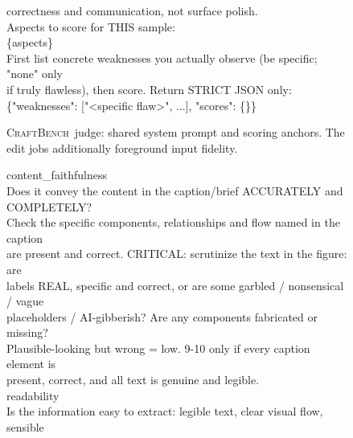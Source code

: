 \documentclass{article}
\newcommand{\CrafterBench}{\textsc{CraftBench}\xspace}
\begin{document}
\begin{figure}[t]
\begin{tcolorbox}
correctness and communication, not surface polish. \\[5pt]
Aspects to score for THIS sample: \\
\{aspects\} \\[5pt]
First list concrete weaknesses you actually observe (be specific; "none" only \\
if truly flawless), then score. Return STRICT JSON only: \\
\{"weaknesses": ["<specific flaw>", ...], "scores": \{<aspect keys>\}\}
\end{tcolorbox}
\caption{\CrafterBench\ judge: shared system prompt and scoring anchors. The edit jobs additionally foreground input fidelity.}
\label{fig:prompt-judge-system}
\end{figure}

\begin{figure}[t]
\centering
\begin{tcolorbox}[title={Aspect definitions filling the $\{$aspects$\}$ slot. Text-to-image uses content\_faithfulness, readability, and one format aspect, while the edit tasks use content\_faithfulness, readability, and input\_fidelity.}, width=\textwidth, colback=gray!5, colframe=black, fonttitle=\bfseries]
\small
content\_faithfulness \\
\hspace*{1.0em}Does it convey the content in the caption/brief ACCURATELY and COMPLETELY? \\
\hspace*{1.0em}Check the specific components, relationships and flow named in the caption \\
\hspace*{1.0em}are present and correct. CRITICAL: scrutinize the text in the figure: are \\
\hspace*{1.0em}labels REAL, specific and correct, or are some garbled / nonsensical / vague \\
\hspace*{1.0em}placeholders / AI-gibberish? Are any components fabricated or missing? \\
\hspace*{1.0em}Plausible-looking but wrong = low. 9-10 only if every caption element is \\
\hspace*{1.0em}present, correct, and all text is genuine and legible. \\[5pt]
readability \\
\hspace*{1.0em}Is the information easy to extract: legible text, clear visual flow, sensible \\

\end{tcolorbox}
\end{figure}
\end{document}
